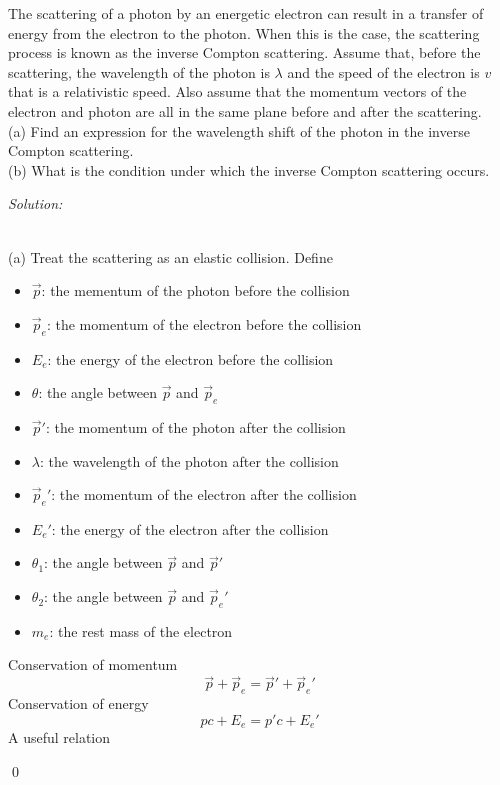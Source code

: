 \documentclass[12pt]{article}
\newenvironment{problem}[2][Problem]{\begin{trivlist}
\item[\hskip \labelsep {\bfseries #1}\hskip \labelsep {\bfseries #2.}]}{\end{trivlist}}
\newenvironment{sol}
    {\emph{Solution:}
    }
    {
    \qed
    }
\begin{document}
\begin{problem}{1}
The scattering of a photon by an energetic electron can result in a transfer of energy from the electron to the photon. When this is the case, the scattering process is known as the inverse Compton scattering. Assume that, before the scattering, the wavelength of the photon is $\lambda$ and the speed of the electron is $v$ that is a relativistic speed. Also assume that the momentum vectors of the electron and photon are all in the same plane before and after the scattering.\\
(a) Find an expression for the wavelength shift of the photon in the inverse Compton scattering.\\
(b) What is the condition under which the inverse Compton scattering occurs.
\end{problem}
\begin{sol}
\\(a) Treat the scattering as an elastic collision. Define
\begin{itemize}
\item $\vec{p}$: the mementum of the photon before the collision
\item $\vec{p}_e$: the momentum of the electron before the collision
\item $E_e$: the energy of the electron before the collision
\item $\theta$: the angle between $\vec{p}$ and $\vec{p}_e$
\item $\vec{p}'$: the momentum of the photon after the collision
\item $\lambda$: the wavelength of the photon after the collision
\item $\vec{p}_e'$: the momentum of the electron after the collision
\item $E_e'$: the energy of the electron after the collision
\item $\theta_1$: the angle between $\vec{p}$ and $\vec{p}'$
\item $\theta_2$: the angle between $\vec{p}$ and $\vec{p}_e'$
\item $m_e$: the rest mass of the electron
\end{itemize}
Conservation of momentum
\begin{equation}
\label{conmom}
\vec{p}+\vec{p}_e=\vec{p}'+\vec{p}_e'
\end{equation}
Conservation of energy
\begin{equation}
\label{conene}
pc+E_e=p'c+E_e'
\end{equation}
A useful relation

\end{sol}
\end{document}
